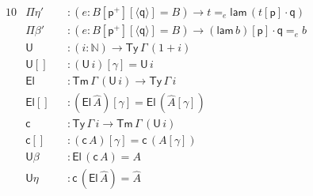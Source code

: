 \documentclass[a4paper,UKenglish,cleveref, autoref, thm-restate]{lipics-v2021}
\newcommand{\ra}{\rightarrow}
\newcommand{\Ty}{\mathsf{Ty}}
\newcommand{\Tm}{\mathsf{Tm}}
\newcommand{\p}{\mathsf{p}}
\newcommand{\q}{\mathsf{q}}
\newcommand{\N}{\mathbb{N}}
\newcommand{\lam}{\mathsf{lam}}
\newcommand{\U}{\mathsf{U}}
\newcommand{\El}{\mathsf{El}}
\newcommand{\cd}{\mathsf{c}}
\begin{document}
\begin{alignat*}{10}
  & \Pi\eta' && : (e:B[\p^+][\langle\q\rangle] = B)\ra t =_e \lam\,(t[\p]\cdot\q) \\
  & \Pi\beta' && : (e:B[\p^+][\langle\q\rangle] = B)\ra (\lam\,b)[\p]\cdot\q =_e b \\
  & \U && : (i:\N)\ra\Ty\,\Gamma\,(1+i) \\
  & \U[] && : (\U\,i)[\gamma] = \U\,i \\  
  & \El && : \Tm\,\Gamma\,(\U\,i) \ra \Ty\,\Gamma\,i \\
  & \El[] && : (\El\,\hat{A})[\gamma] = \El\,(\hat{A}[\gamma]) \\
  & \cd && : \Ty\,\Gamma\,i\ra\Tm\,\Gamma\,(\U\,i) \\
  & \cd[] && : (\cd\,A)[\gamma] = \cd\,(A[\gamma]) \\
  & \U\beta && : \El\,(\cd\,A) = A \\
  & \U\eta && : \cd\,(\El\,\hat{A}) = \hat{A}
\end{alignat*}
\end{document}
